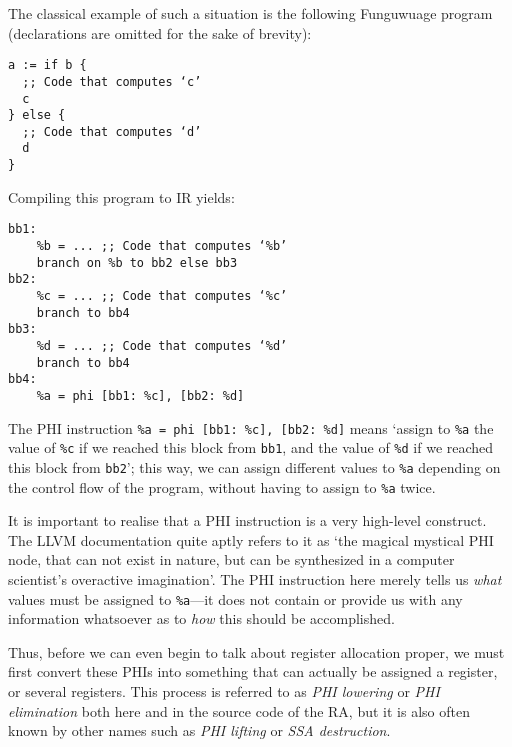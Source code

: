 \documentclass[12pt]{report}
\newcommand{\langname}{Funguwuage}
\begin{document}
The classical example of such a situation is the following \langname{} program (declarations are omitted for the sake of brevity):
\begin{Verbatim}
a := if b {
  ;; Code that computes ‘c’
  c
} else {
  ;; Code that computes ‘d’
  d
}
\end{Verbatim}

\noindent Compiling this program to IR yields:
\begin{Verbatim}
bb1:
    %b = ... ;; Code that computes ‘%b’
    branch on %b to bb2 else bb3
bb2:
    %c = ... ;; Code that computes ‘%c’
    branch to bb4
bb3:
    %d = ... ;; Code that computes ‘%d’
    branch to bb4
bb4:
    %a = phi [bb1: %c], [bb2: %d]
\end{Verbatim}

\noindent The PHI instruction \verb|%a = phi [bb1: %c], [bb2: %d]| means ‘assign to \verb|%a| the value of \verb|%c| if we reached this block
from \verb|bb1|, and the value of \verb|%d| if we reached this block from \verb|bb2|’; this way, we can assign different values to \verb|%a|
depending on the control flow of the program, without having to assign to \verb|%a| twice.

It is important to realise that a PHI instruction is a very high-level construct. The LLVM documentation quite aptly refers to it as ‘the
magical mystical PHI node, that can not exist in nature, but can be synthesized in a computer scientist's overactive imagination’. The PHI
instruction here merely tells us \textit{what} values must be assigned to \verb|%a|—it does not contain or provide us with any information
whatsoever as to \textit{how} this should be accomplished.

Thus, before we can even begin to talk about register allocation proper, we must first convert these PHIs into something that can
actually be assigned a register, or several registers. This process is referred to as \textit{PHI lowering} or \textit{PHI elimination}
both here and in the source code of the RA, but it is also often known by other names such as \textit{PHI lifting} or \textit{SSA
destruction}.
\end{document}

